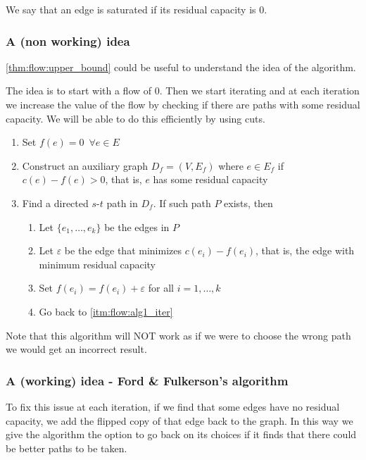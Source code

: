 \documentclass[12pt]{extarticle}
\begin{document}
\begin{definition}
    We say that an edge is saturated if its residual capacity is $0$.
\end{definition}

\subsubsection{A (non working) idea}

\autoref{thm:flow:upper_bound} could be useful to understand the idea of the algorithm.

The idea is to start with a flow of $0$. Then we start iterating and at each iteration we increase the value of the flow by checking if there are paths with some residual capacity.
We will be able to do this efficiently by using cuts.

\begin{enumerate}
    \item Set $f(e) = 0 \enspace \forall e \in E$
    \item \label{itm:flow:alg1_iter} Construct an auxiliary graph $D_f = (V, E_f)$ where $e \in E_f$ if $c(e) - f(e) > 0$, that is, $e$ has some residual capacity
    \item Find a directed $s$-$t$ path in $D_f$. If such path $P$ exists, then
          \begin{enumerate}[label*=\arabic*.]
              \item Let $\{e_1, \ldots, e_k\}$ be the edges in $P$
              \item Let $\varepsilon$ be the edge that minimizes $c(e_i) - f(e_i)$, that is, the edge with minimum residual capacity
              \item Set $f(e_i) = f(e_i) + \varepsilon$ for all $i = 1, \ldots, k$
              \item Go back to \autoref{itm:flow:alg1_iter}
          \end{enumerate}
\end{enumerate}

Note that this algorithm will NOT work as if we were to choose the wrong path we would get an incorrect result.


\subsubsection{A (working) idea - Ford \& Fulkerson's algorithm}

To fix this issue at each iteration, if we find that some edges have no residual capacity, we add the flipped copy of that edge back to the graph.
In this way we give the algorithm the option to go back on its choices if it finds that there could be better paths to be taken.
\end{document}
